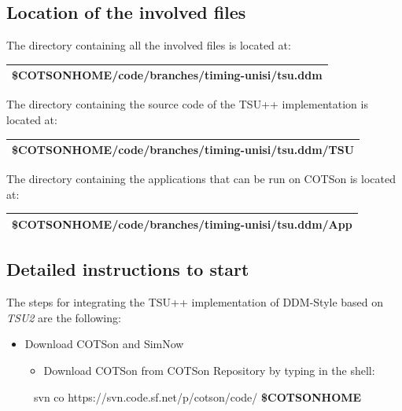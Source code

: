 \documentclass[a4paper]{article}
\begin{document}
\subsection[Location of the involved files]{Location of the involved
files}
{
The directory containing all the involved files is located at: }

\begin{flushleft}
\tablehead{}
\begin{supertabular}{|m{6.29346in}|}
\hline
{}\ttfamily
\$COTSONHOME/code/branches/timing-unisi/tsu.ddm\\\hline
\end{supertabular}
\end{flushleft}
{
The directory containing the source code of the TSU++ implementation is
located at: }

\begin{flushleft}
\tablehead{}
\begin{supertabular}{|m{6.29346in}|}
\hline
{}\ttfamily
\$COTSONHOME/code/branches/timing-unisi/tsu.ddm/TSU\\\hline
\end{supertabular}
\end{flushleft}
{
The directory containing the applications that can be run on COTSon is
located at:}

\begin{flushleft}
\tablehead{}
\begin{supertabular}{|m{6.29346in}|}
\hline
{}\ttfamily
\$COTSONHOME/code/branches/timing-unisi/tsu.ddm/App\\\hline
\end{supertabular}
\end{flushleft}
\subsection[Detailed instructions to start]{Detailed instructions to
start}
{
The steps for integrating the TSU++ implementation of DDM-Style based on
\textit{TSU2} are the following: }


\bigskip

\begin{itemize}
\item {
Download COTSon and SimNow}

\begin{itemize}
\item {
Download COTSon from COTSon Repository by typing in the shell: }
\end{itemize}
\end{itemize}
{
\ \ \ \ \ svn co https://svn.code.sf.net/p/cotson/code/
\textbf{\$COTSONHOME} }
\end{document}
